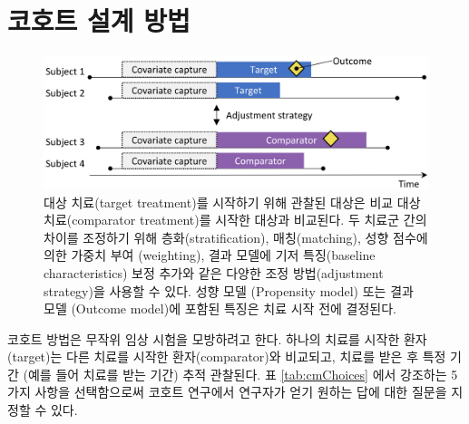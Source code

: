 \documentclass[11pt]{book}
\theoremstyle{definition}
\theoremstyle{definition}
\theoremstyle{definition}
\theoremstyle{remark}
\begin{document}
\section{코호트 설계 방법}\label{CohortMethod}


\begin{figure}

{\centering \includegraphics[width=0.9\linewidth]{images/PopulationLevelEstimation/cohortMethod} 

}

\caption{대상 치료(target treatment)를 시작하기 위해 관찰된 대상은 비교 대상 치료(comparator treatment)를 시작한 대상과 비교된다. 두 치료군 간의 차이를 조정하기 위해 층화(stratification), 매칭(matching), 성향 점수에 의한 가중치 부여 (weighting), 결과 모델에 기저 특징(baseline characteristics) 보정 추가와 같은 다양한 조정 방법(adjustment strategy)을 사용할 수 있다. 성향 모델 (Propensity model) 또는 결과 모델 (Outcome model)에 포함된 특징은 치료 시작 전에 결정된다.}\label{fig:cohortMethod}
\end{figure}

코호트 방법은 무작위 임상 시험을 모방하려고 한다. \citep{hernan_2016}
하나의 치료를 시작한 환자(target)는 다른 치료를 시작한
환자(comparator)와 비교되고, 치료를 받은 후 특정 기간 (예를 들어 치료를
받는 기간) 추적 관찰된다. 표 \ref{tab:cmChoices} 에서 강조하는 5가지
사항을 선택함으로써 코호트 연구에서 연구자가 얻기 원하는 답에 대한
질문을 지정할 수 있다. 
 
\end{document}
